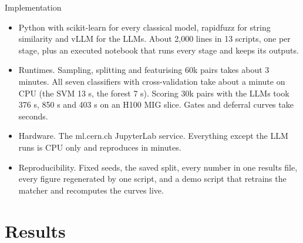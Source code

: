 \documentclass[aspectratio=169,10pt]{beamer}
\begin{document}
\begin{frame}{Implementation}
\begin{itemize}
\item Python with scikit-learn for every classical model, rapidfuzz for string similarity and vLLM for the LLMs. About 2{,}000 lines in 13 scripts, one per stage, plus an executed notebook that runs every stage and keeps its outputs.
\item Runtimes. Sampling, splitting and featurising 60k pairs takes about 3 minutes. All seven classifiers with cross-validation take about a minute on CPU (the SVM 13 s, the forest 7 s). Scoring 30k pairs with the LLMs took 376 s, 850 s and 403 s on an H100 MIG slice. Gates and deferral curves take seconds.
\item Hardware. The ml.cern.ch JupyterLab service. Everything except the LLM runs is CPU only and reproduces in minutes.
\item Reproducibility. Fixed seeds, the saved split, every number in one results file, every figure regenerated by one script, and a demo script that retrains the matcher and recomputes the curves live.
\end{itemize}
\end{frame}

\section{Results}
\end{document}
